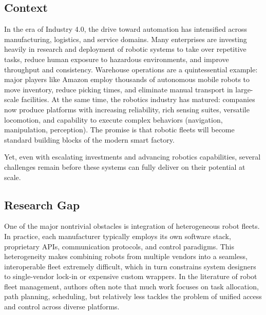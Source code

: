 \documentclass[conference]{IEEEtran}
\begin{document}
\subsection{Context}
In the era of Industry 4.0, 
 the drive toward automation has intensified across manufacturing, 
 logistics, and service domains. 
% 
Many enterprises are investing heavily in research and deployment of robotic systems 
to take over repetitive tasks, reduce human exposure to hazardous environments, 
 and improve throughput and consistency. 
% 
Warehouse operations are a quintessential example: 
 major players like Amazon employ thousands of autonomous mobile robots to move inventory, 
 reduce picking times, and eliminate manual transport in large-scale facilities.
%
At the same time, the robotics industry has matured: 
 companies now produce platforms with increasing reliability, rich sensing suites, versatile locomotion, 
 and capability to execute complex behaviors (navigation, manipulation, perception). 
% 
The promise is that robotic fleets will become standard building blocks of the modern smart factory.

Yet, even with escalating investments and advancing robotics capabilities, 
 several challenges remain before these systems can fully deliver on their potential at scale.

\subsection{Research Gap}
One of the major nontrivial obstacles is integration of heterogeneous robot fleets. 
%
In practice, 
 each manufacturer typically employs its own software stack, proprietary APIs, 
 communication protocols, and control paradigms. 
% 
This heterogeneity makes combining robots from multiple vendors into a seamless, 
 interoperable fleet extremely difficult, which in turn constrains system designers 
 to single-vendor lock-in or expensive custom wrappers. 
% 
In the literature of robot fleet management, 
 authors often note that much work focuses on task allocation, path planning, scheduling, 
 but relatively less tackles the problem of unified access and control across diverse platforms. 
\end{document}
